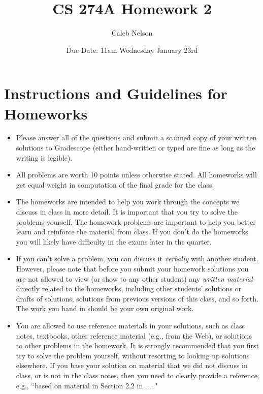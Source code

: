 \documentclass[11pt]{article}
\begin{document}
\setlength{\parskip}{1.2ex plus0.3ex minus 0.3ex}


\thispagestyle{empty} \pagestyle{myheadings} 



\title{CS 274A Homework 2}
\author{Caleb Nelson}
\date{Due Date:  11am Wednesday January 23rd}

\maketitle


\section*{Instructions and Guidelines for Homeworks}
 \begin{itemize}

\item
Please answer all of the questions and submit a scanned copy of your written solutions to Gradescope 
(either hand-written or typed are fine as long as the writing is legible). 

\item
All problems are worth 10 points unless otherwise stated.  All homeworks will get equal weight in computation of the final grade for the class.
 \item
The homeworks are intended to help you work through the concepts
we discuss in class in  more detail. It is important that you try
to solve the problems yourself. The homework problems are important to help you better
learn and reinforce the material from class. If you don't
do the homeworks you will likely have difficulty in the exams
later in the quarter.

\item If you can't solve a
problem, you can discuss it {\it verbally} with another student. However, please note that before you submit your homework solutions you
are not allowed to view (or show to any other student) any {\it written material} directly related to the homeworks, including other students' solutions or drafts of solutions, solutions from previous versions of this class, and so forth. The work you hand in should be your own original work.

\item You are allowed to use reference materials in your solutions, such as class notes, textbooks,  other reference material (e.g., from the Web), or solutions to other problems in the homework. It is strongly recommended that you first try to solve the problem yourself, without resorting to looking up solutions elsewhere. If you base your solution on material that we did not discuss in class, or is not in the class notes, then you need to clearly provide a reference, e.g., ``based on material in Section 2.2 in ....."



\end{itemize}
\end{document}
